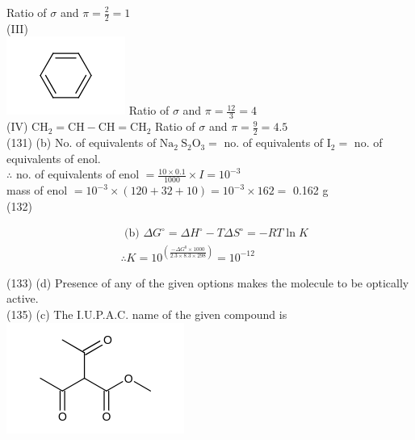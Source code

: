 \documentclass[10pt]{article}
\begin{document}
Ratio of $\sigma$ and $\pi=\frac{2}{2}=1$\\
(III)\\
\includegraphics{smile-2a6b733ed9a7b135dfa399d1f9fcfda9ed431793} Ratio of $\sigma$ and $\pi=\frac{12}{3}=4$\\
(IV) $\mathrm{CH}_{2}=\mathrm{CH}-\mathrm{CH}=\mathrm{CH}_{2}$ Ratio of $\sigma$ and $\pi=\frac{9}{2}=4.5$\\
(131) (b) No. of equivalents of $\mathrm{Na}_{2} \mathrm{~S}_{2} \mathrm{O}_{3}=$ no. of equivalents of $\mathrm{I}_{2}=$ no. of equivalents of enol.\\
$\therefore$ no. of equivalents of enol $=\frac{10 \times 0.1}{1000} \times I=10^{-3}$\\
mass of enol $=10^{-3} \times(120+32+10)=10^{-3} \times 162=$ 0.162 g\\
(132)

$$
\begin{aligned}
& \text { (b) } \Delta G^{\circ}=\Delta H^{\circ}-T \Delta S^{\circ}=-R T \ln K \\
& \therefore K=10^{\left(\frac{-\Delta G^{0} \times 1000}{2.3 \times 8.3 \times 298}\right)}=10^{-12}
\end{aligned}
$$

(133) (d) Presence of any of the given options makes the molecule to be optically active.\\
(135) (c) The I.U.P.A.C. name of the given compound is\\
\includegraphics{smile-485576e38fce5ddf2290b337e8181066ceff48f1}
\end{document}

